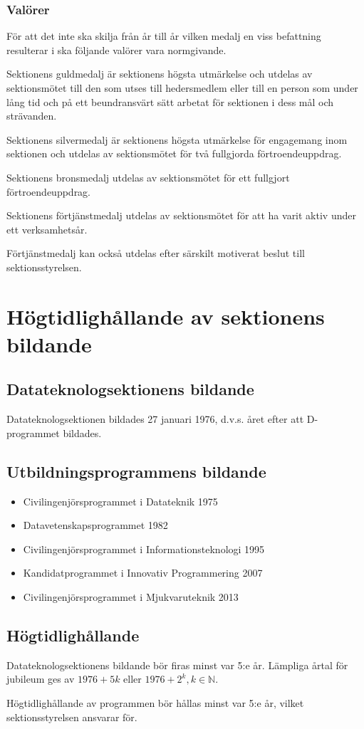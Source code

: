\documentclass{datateknologsektionen-document}
\begin{document}
\subsubsection{Valörer}
För att det inte ska skilja från år till år vilken medalj en viss befattning resulterar
i ska följande valörer vara normgivande.

Sektionens guldmedalj är sektionens högsta utmärkelse och utdelas av sektionsmötet
till den som utses till hedersmedlem eller till en person som under lång tid och på
ett beundransvärt sätt arbetat för sektionen i dess mål och strävanden.

Sektionens silvermedalj är sektionens högsta utmärkelse för engagemang inom sektionen
och utdelas av sektionsmötet för två fullgjorda förtroendeuppdrag.

Sektionens bronsmedalj utdelas av sektionsmötet för ett fullgjort förtroendeuppdrag.

Sektionens förtjänstmedalj utdelas av sektionsmötet för att ha varit aktiv under ett verksamhetsår.

Förtjänstmedalj kan också utdelas efter särskilt motiverat beslut till sektionsstyrelsen.

\section{Högtidlighållande av sektionens bildande}
\subsection{Datateknologsektionens bildande}
Datateknologsektionen bildades 27 januari 1976, d.v.s. året efter att D-programmet bildades.

\subsection{Utbildningsprogrammens bildande}
\begin{itemize}
  \item Civilingenjörsprogrammet i Datateknik 1975
  \item Datavetenskapsprogrammet 1982
  \item Civilingenjörsprogrammet i Informationsteknologi 1995
  \item Kandidatprogrammet i Innovativ Programmering 2007
  \item Civilingenjörsprogrammet i Mjukvaruteknik 2013
\end{itemize}

\subsection{Högtidlighållande}
\label{hogtidshallande}
Datateknologsektionens bildande bör firas minst var 5:e år. Lämpliga årtal för jubileum
ges av \(1976 + 5k\) eller \(1976 + 2^k, k \in \mathbb{N}\).

Högtidlighållande av programmen bör hållas minst var 5:e år, vilket sektionsstyrelsen ansvarar för.
\end{document}
